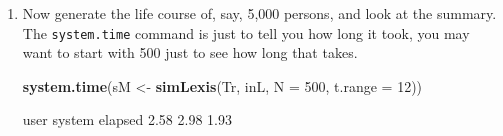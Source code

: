 \documentclass[
]{book}
\newenvironment{Shaded}{\begin{snugshade}}{\end{snugshade}}
\newcommand{\AttributeTok}[1]{\textcolor[rgb]{0.13,0.29,0.53}{#1}}
\newcommand{\DecValTok}[1]{\textcolor[rgb]{0.00,0.00,0.81}{#1}}
\newcommand{\FunctionTok}[1]{\textcolor[rgb]{0.13,0.29,0.53}{\textbf{#1}}}
\newcommand{\NormalTok}[1]{#1}
\newcommand{\OtherTok}[1]{\textcolor[rgb]{0.56,0.35,0.01}{#1}}
\newcommand{\StringTok}[1]{\textcolor[rgb]{0.31,0.60,0.02}{#1}}
\begin{document}
\begin{enumerate}
\begin{Shaded}
\begin{Highlighting}[]
\FunctionTok{summary}\NormalTok{(iL, }\AttributeTok{by =} \StringTok{"sex"}\NormalTok{)}
\end{Highlighting}
\end{Shaded}

\begin{Shaded}
\begin{Highlighting}[]
\NormalTok{$M}

\NormalTok{Transitions:}
\NormalTok{     To}
\NormalTok{From  NRA Rem ESRD ESRD(Rem)  Records:  Events: Risk time:  Persons:}
\NormalTok{  NRA   1   1    8         0        10        9       98.3        10}
\NormalTok{  Rem   0   0    0         1         1        1       12.0         1}
\NormalTok{  Sum   1   1    8         1        11       10      110.3        10}

\NormalTok{$F}

\NormalTok{Transitions:}
\NormalTok{     To}
\NormalTok{From  NRA Rem ESRD ESRD(Rem)  Records:  Events: Risk time:  Persons:}
\NormalTok{  NRA   0   4    6         0        10       10       55.0        10}
\NormalTok{  Rem   0   0    0         4         4        4       28.2         4}
\NormalTok{  Sum   0   4    6         4        14       14       83.2        10}
\end{Highlighting}
\end{Shaded}

  What type of object have you got as \texttt{iL}?
\item
  Now generate the life course of, say, 5,000 persons, and look at the summary.
  The \texttt{system.time} command is just to tell you how long it
  took, you may want to start with 500 just to see how long that takes.

\begin{Shaded}
\begin{Highlighting}[]
\FunctionTok{system.time}\NormalTok{(sM }\OtherTok{\textless{}{-}} \FunctionTok{simLexis}\NormalTok{(Tr, inL, }\AttributeTok{N =} \DecValTok{500}\NormalTok{, }\AttributeTok{t.range =} \DecValTok{12}\NormalTok{))}
\end{Highlighting}
\end{Shaded}

\begin{Shaded}
\begin{Highlighting}[]
\NormalTok{   user  system elapsed }
\NormalTok{   2.58    2.98    1.93 }
\end{Highlighting}
\end{Shaded}


\end{enumerate}
\end{document}
